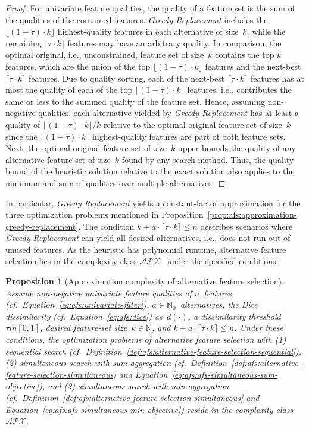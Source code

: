 \documentclass{article}
\newtheorem{proposition}{Proposition}
\theoremstyle{definition}
\begin{document}
%
\begin{proof}
	For univariate feature qualities, the quality of a feature set is the sum of the qualities of the contained features.
	\emph{Greedy Replacement} includes the $\lfloor (1 - \tau) \cdot k \rfloor$ highest-quality features in each alternative of size~$k$, while the remaining $\lceil \tau \cdot k \rceil$ features may have an arbitrary quality.
	In comparison, the optimal original, i.e., unconstrained, feature set of size~$k$ contains the top $k$ features, which are the union of the top $\lfloor (1 - \tau) \cdot k \rfloor$ features and the next-best $\lceil \tau \cdot k \rceil$ features.
	Due to quality sorting, each of the next-best $\lceil \tau \cdot k \rceil$ features has at most the quality of each of the top $\lfloor (1 - \tau) \cdot k \rfloor$ features, i.e., contributes the same or less to the summed quality of the feature set.
	Hence, assuming non-negative qualities, each alternative yielded by \emph{Greedy Replacement} has at least a quality of $\lfloor (1 - \tau) \cdot k \rfloor / k$ relative to the optimal original feature set of size~$k$ since the $\lfloor (1 - \tau) \cdot k \rfloor$ highest-quality features are part of both feature sets.
	Next, the optimal original feature set of size~$k$ upper-bounds the quality of any alternative feature set of size~$k$ found by any search method.
	Thus, the quality bound of the heuristic solution relative to the exact solution also applies to the minimum and sum of qualities over multiple alternatives.
\end{proof}
%
In particular, \emph{Greedy Replacement} yields a constant-factor approximation for the three optimization problems mentioned in Proposition~\ref{prop:afs:approximation-greedy-replacement}.
The condition $k + a \cdot \lceil \tau \cdot k \rceil \leq n$ describes scenarios where \emph{Greedy Replacement} can yield all desired alternatives, i.e., does not run out of unused features.
As the heuristic has polynomial runtime, alternative feature selection lies in the complexity class $\mathcal{APX}$~\cite{khanna1998syntactic} under the specified conditions:
%
\begin{proposition}[Approximation complexity of alternative feature selection]
	Assume non-negative univariate feature qualities of $n$~features (cf.~Equation~\ref{eq:afs:univariate-filter}), $a \in \mathbb{N}_0$~alternatives, the Dice dissimilarity (cf.~Equation~\ref{eq:afs:dice}) as~$d(\cdot)$, a dissimilarity threshold~$\tau in [0,1]$, desired feature-set size~$k \in \mathbb{N}$, and $k + a \cdot \lceil \tau \cdot k \rceil \leq n$.
	Under these conditions, the optimization problems of alternative feature selection with (1) sequential search (cf.~Definition~\ref{def:afs:alternative-feature-selection-sequential}), (2) simultaneous search with sum-aggregation (cf.~Definition~\ref{def:afs:alternative-feature-selection-simultaneous} and Equation~\ref{eq:afs:afs-simultaneous-sum-objective}), and (3) simultaneous search with min-aggregation (cf.~Definition~\ref{def:afs:alternative-feature-selection-simultaneous} and Equation~\ref{eq:afs:afs-simultaneous-min-objective}) reside in the complexity class~$\mathcal{APX}$.
	\label{prop:afs:approximation-apx}
\end{proposition}
\end{document}
